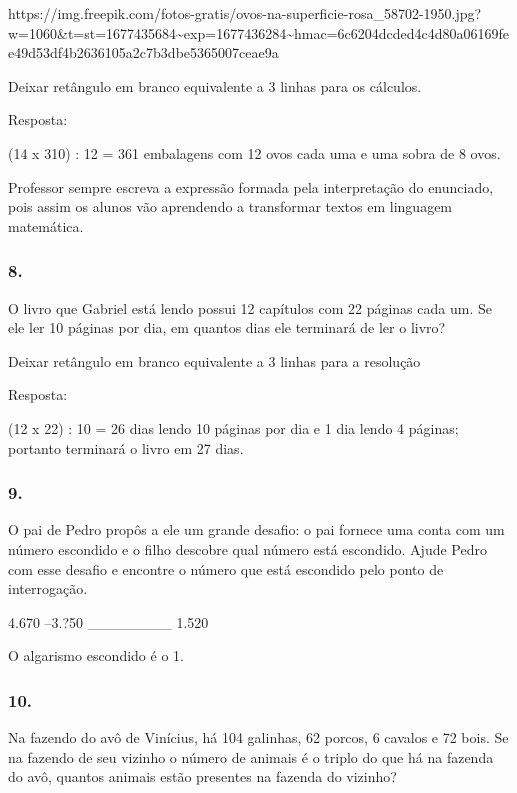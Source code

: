 \begin{enumerate}
\begin{escolha}
https://img.freepik.com/fotos-gratis/ovos-na-superficie-rosa\_58702-1950.jpg?w=1060\&t=st=1677435684\textasciitilde{}exp=1677436284\textasciitilde{}hmac=6c6204dcded4c4d80a06169fee49d53df4b2636105a2c7b3dbe5365007ceae9a

Deixar retângulo em branco equivalente a 3 linhas para os cálculos.

Resposta:

(14 x 310) : 12 = 361 embalagens com 12 ovos cada uma e uma sobra de 8
ovos.

Professor sempre escreva a expressão formada pela interpretação do
enunciado, pois assim os alunos vão aprendendo a transformar textos em linguagem
matemática.

\subsubsection{8.}\label{section-20}

O livro que Gabriel está lendo possui 12 capítulos com 22 páginas cada
um. Se ele ler 10 páginas por dia, em quantos dias ele terminará de ler
o livro?

Deixar retângulo em branco equivalente a 3 linhas para a resolução

Resposta:

(12 x 22) : 10 = 26 dias lendo 10 páginas por dia e 1 dia lendo 4 páginas; portanto terminará o livro em 27 dias.

\subsubsection{9.}\label{section-21}

O pai de Pedro propôs a ele um grande desafio:
o pai fornece uma conta com um número escondido e o filho 
descobre qual número está escondido. Ajude Pedro com esse desafio e
encontre o número que está escondido pelo ponto de interrogação.

  4.670
--3.?50
________
  1.520

O algarismo escondido é o 1.

\subsubsection{10.}\label{section-22}

Na fazendo do avô de Vinícius, há 104 galinhas, 62 porcos, 6 cavalos e 72
bois. Se na fazendo de seu vizinho o número de animais é o triplo do que
há na fazenda do avô, quantos animais estão presentes na fazenda do
vizinho?


\end{escolha}
\end{enumerate}
